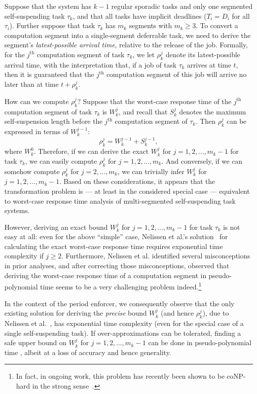 Suppose that the system has $k-1$ regular sporadic tasks and only one segmented self-suspending task $\tau_k$, and that all tasks have implicit deadlines ($T_i = D_i$ for all $\tau_i$). Further suppose that task $\tau_k$ has $m_k$ segments with $m_k \geq 3$.  To  convert a computation segment into a single-segment deferrable task, we need to derive the segment's \emph{latest-possible arrival time}, relative to the release of the job. Formally,  for the $j^{\mathrm{th}}$ computation segment of task $\tau_k$, we let $\rho_k^j$ denote its latest-possible arrival time, with the interpretation that, if a job of task $\tau_k$ arrives at time $t$, then  it is guaranteed that the $j^{\mathrm{th}}$ computation segment of this job will arrive no later than at time $t+\rho_k^j$.

How can we compute $\rho_k^j$? Suppose that the worst-case response time of the $j^{\mathrm{th}}$ computation segment of task $\tau_k$ is $W_k^j$, and recall that $S_k^{j}$ denotes the maximum self-suspension length before the $j^{\mathrm{th}}$ computation segment of $\tau_k$. Then $\rho_k^j$ can be expressed in terms of $W_k^{j-1}$:
$$
	\rho_k^j = W_k^{j-1}+S_k^{j-1},
$$
where $W_k^0$.  Therefore, if we can derive the exact $W_k^j$ for $j=1,2,\ldots,m_k-1$ for task $\tau_k$, we can easily compute $\rho_k^j$  for $j=1,2,\ldots,m_k$. And conversely, if we can somehow compute $\rho_k^j$  for $j=2,\ldots,m_k$, we  can trivially infer $W_k^j$ for $j=1,2,\ldots,m_k-1$.
Based on these considerations, it appears that the transformation problem is  --- at least in the considered special case --- equivalent to worst-case response time analysis of multi-segmented self-suspending task systems. 

However, deriving an exact bound $W_k^j$ for $j=1,2,\ldots,m_k-1$ for task $\tau_k$ is not easy at all: 
even for the above ``simple'' case, Nelissen et al.'s solution~\cite{ecrts15nelissen} for calculating the exact worst-case response time requires exponential time complexity if $j \geq 2$. Furthermore, Nelissen et al. \cite{ecrts15nelissen} identified several misconceptions in prior analyses, and after correcting those misconceptions, observed that deriving the worst-case response time of a computation segment in pseudo-polynomial time seems to be a very challenging problem indeed.\footnote{In fact, in ongoing work, this problem has recently been shown to be coNP-hard in the strong sense~\cite{Chen2016b}.}

In the context of the period enforcer, we consequently observe that the only existing solution for deriving the \emph{precise} bound $W_k^{j}$ (and hence $\rho_k^j$), due to Nelissen et al.\ \cite{ecrts15nelissen},  has exponential time complexity (even for the special case of a single self-suspending task). If over-approximations can be tolerated, finding a safe upper bound on $W_k^j$ for $j=1,2,\ldots,m_k-1$ can be done in pseudo-polynomial time \cite{PH:rtss98,Huang:multiseg}, albeit at a loss of accuracy and hence generality. 

